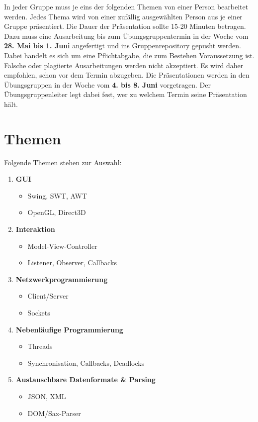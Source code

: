 \documentclass{programmierpraktikum}
\subtitle{Seminarreferate}
\begin{document}
\maketitle
%
In jeder Gruppe muss je eins der folgenden Themen von einer Person be\-ar\-bei\-tet werden. Jedes Thema wird von einer zufällig ausgewählten Person aus je einer Gruppe präsentiert. Die Dauer der Präsentation sollte 15-20 Minuten betragen. Dazu muss eine Ausarbeitung bis zum Übungsgruppentermin in der Woche vom \textbf{28. Mai bis 1. Juni} angefertigt und ins Grup\-pen\-re\-po\-si\-to\-ry ge\-pusht werden. Dabei handelt es sich um eine Pflichtabgabe, die zum Bestehen Voraussetzung ist. Falsche oder plagiierte Ausarbeitungen werden nicht akzeptiert. Es wird daher empfohlen, schon vor dem Termin abzugeben. Die Präsentationen werden in den Übungsgruppen in der Woche vom \textbf{4. bis 8. Juni} vorgetragen. Der Übungsgruppenleiter legt dabei fest, wer zu welchem Termin seine Präsentation hält.
%
\section{Themen}
Folgende Themen stehen zur Auswahl:
\begin{enumerate}
  \renewcommand{\labelenumi}{\textbf{\theenumi.}}
  \item \textbf{GUI}
    \begin{itemize}
      \item Swing, SWT, AWT
      \item OpenGL, Direct3D
    \end{itemize}
  \item \textbf{Interaktion}
    \begin{itemize}
      \item Model-View-Controller
      \item Listener, Observer, Callbacks
    \end{itemize}
  \item \textbf{Netzwerkprogrammierung}
    \begin{itemize}
      \item Client/Server
      \item Sockets
    \end{itemize}
  \item \textbf{Nebenläufige Programmierung}
    \begin{itemize}
      \item Threads
      \item Synchronisation, Callbacks, Deadlocks
    \end{itemize}
  \item \textbf{Austauschbare Datenformate \& Parsing}
    \begin{itemize}
      \item JSON, XML
      \item DOM/Sax-Parser
    \end{itemize}
\end{enumerate}
\end{document}
